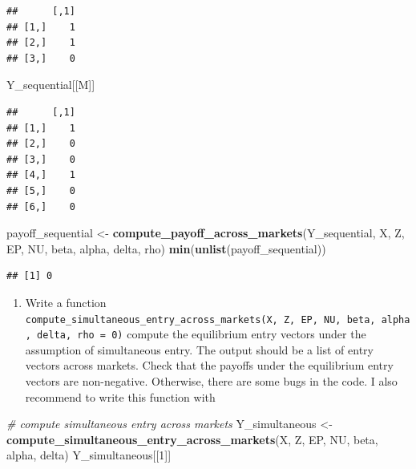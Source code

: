 \documentclass[]{book}
\newenvironment{Shaded}{\begin{snugshade}}{\end{snugshade}}
\newcommand{\KeywordTok}[1]{\textcolor[rgb]{0.13,0.29,0.53}{\textbf{#1}}}
\newcommand{\DecValTok}[1]{\textcolor[rgb]{0.00,0.00,0.81}{#1}}
\newcommand{\StringTok}[1]{\textcolor[rgb]{0.31,0.60,0.02}{#1}}
\newcommand{\CommentTok}[1]{\textcolor[rgb]{0.56,0.35,0.01}{\textit{#1}}}
\newcommand{\NormalTok}[1]{#1}
\providecommand{\tightlist}{%
  \setlength{\itemsep}{0pt}\setlength{\parskip}{0pt}}
\begin{document}
\begin{verbatim}
##      [,1]
## [1,]    1
## [2,]    1
## [3,]    0
\end{verbatim}

\begin{Shaded}
\begin{Highlighting}[]
\NormalTok{Y_sequential[[M]]}
\end{Highlighting}
\end{Shaded}

\begin{verbatim}
##      [,1]
## [1,]    1
## [2,]    0
## [3,]    0
## [4,]    1
## [5,]    0
## [6,]    0
\end{verbatim}

\begin{Shaded}
\begin{Highlighting}[]
\NormalTok{payoff_sequential <-}
\StringTok{  }\KeywordTok{compute_payoff_across_markets}\NormalTok{(Y_sequential, X, Z, EP, NU, beta, alpha, delta, rho)}
\KeywordTok{min}\NormalTok{(}\KeywordTok{unlist}\NormalTok{(payoff_sequential))}
\end{Highlighting}
\end{Shaded}

\begin{verbatim}
## [1] 0
\end{verbatim}

\begin{enumerate}
\def\labelenumi{\arabic{enumi}.}
\setcounter{enumi}{7}
\tightlist
\item
  Write a function
  \texttt{compute\_simultaneous\_entry\_across\_markets(X,\ Z,\ EP,\ NU,\ beta,\ alpha,\ delta,\ rho\ =\ 0)}
  compute the equilibrium entry vectors under the assumption of
  simultaneous entry. The output should be a list of entry vectors
  across markets. Check that the payoffs under the equilibrium entry
  vectors are non-negative. Otherwise, there are some bugs in the code.
  I also recommend to write this function with
\end{enumerate}

\begin{Shaded}
\begin{Highlighting}[]
\CommentTok{# compute simultaneous entry across markets}
\NormalTok{Y_simultaneous <-}
\StringTok{  }\KeywordTok{compute_simultaneous_entry_across_markets}\NormalTok{(X, Z, EP, NU, beta, alpha, delta)}
\NormalTok{Y_simultaneous[[}\DecValTok{1}\NormalTok{]]}
\end{Highlighting}
\end{Shaded}
\end{document}

